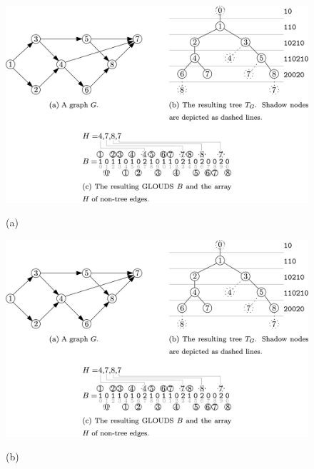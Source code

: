 \begin{figure}%
    	\centering
    	\begin{minipage}{\textwidth}
    		\begin{minipage}{0.45\textwidth}
    			\centering
    			\includegraphics[scale=1.4, clip,  trim=0 110 168 26]{img/arte/GLOUDS.jpg}
    		
    			(a)
    		\end{minipage}
    		\begin{minipage}{0.45\textwidth}
    			\centering
    			\includegraphics[scale=1.4, clip, trim=168 110 0 0]{img/arte/GLOUDS.jpg}
    		
    			(b)
    		\end{minipage}
    	\end{minipage}
    	

\end{figure}
